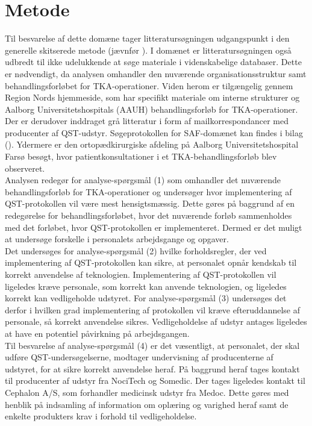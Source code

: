 \section{Metode}
Til besvarelse af dette domæne tager litteratursøgningen udgangspunkt i den generelle skitserede metode (jævnfør ). I domænet er litteratursøgningen også udbredt til ikke udelukkende at søge materiale i videnskabelige databaser. Dette er nødvendigt, da analysen omhandler den nuværende organisationsstruktur samt behandlingsforløbet for TKA-operationer. Viden herom er tilgængelig gennem Region Nords hjemmeside, som har specifikt materiale om interne strukturer og Aalborg Universitetshospitals (AAUH) behandlingsforløb for TKA-operationer. Der er derudover inddraget grå litteratur i form af mailkorrespondancer med producenter af QST-udstyr. Søgeprotokollen for SAF-domænet kan findes i bilag (). Ydermere er den ortopædkirurgiske afdeling på Aalborg Universitetshospital Farsø besøgt, hvor patientkonsultationer i et TKA-behandlingsforløb blev observeret. \\
Analysen redegør for analyse-spørgsmål (1) som omhandler det nuværende behandlingsforløb for TKA-operationer og undersøger hvor implementering af QST-protokollen vil være mest hensigtsmæssig. Dette gøres på baggrund af en redegørelse for behandlingsforløbet, hvor det nuværende forløb sammenholdes med det forløbet, hvor QST-protokollen er implementeret. Dermed er det muligt at undersøge forskelle i personalets arbejdsgange og opgaver. \\
Det undersøges for analyse-spørgsmål (2) hvilke forholdsregler, der ved implementering af QST-protokollen kan sikre, at personalet opnår kendskab til korrekt anvendelse af teknologien.
Implementering af QST-protokollen vil ligeledes kræve personale, som korrekt kan anvende teknologien, og ligeledes korrekt kan vedligeholde udstyret. For analyse-spørgsmål (3) undersøges det derfor i hvilken grad implementering af protokollen vil kræve efteruddannelse af personale, så korrekt anvendelse sikres. Vedligeholdelse af udstyr antages ligeledes at have en potentiel påvirkning på arbejdsgangen. \\
Til besvarelse af analyse-spørgsmål (4) er det væsentligt, at personalet, der skal udføre QST-undersøgelserne, modtager undervisning af producenterne af udstyret, for at sikre korrekt anvendelse heraf. På baggrund heraf tages kontakt til producenter af udstyr fra NociTech og Somedic. Der tages ligeledes kontakt til Cephalon A/S, som forhandler medicinsk udstyr fra Medoc. Dette gøres med henblik på indsamling af information om oplæring og varighed heraf samt de enkelte produkters krav i forhold til vedligeholdelse.

